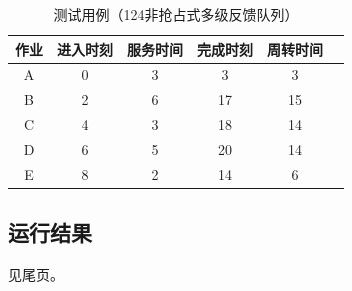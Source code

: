 \documentclass[UTF8]{ctexart}
\begin{document}
\begin{table}[htbp]
    \caption{测试用例（124非抢占式多级反馈队列）}
    \centering
    \begin{tabular}{cccccc}
        \toprule
        作业 & 进入时刻 & 服务时间 & 完成时刻 & 周转时间 \\
        \midrule
        A    & 0        & 3        & 3        & 3        \\
        B    & 2        & 6        & 17       & 15       \\
        C    & 4        & 3        & 18       & 14       \\
        D    & 6        & 5        & 20       & 14       \\
        E    & 8        & 2        & 14       & 6        \\
        \bottomrule
    \end{tabular}
    \qquad
\end{table}

\subsection{运行结果}

见尾页。
\end{document}
